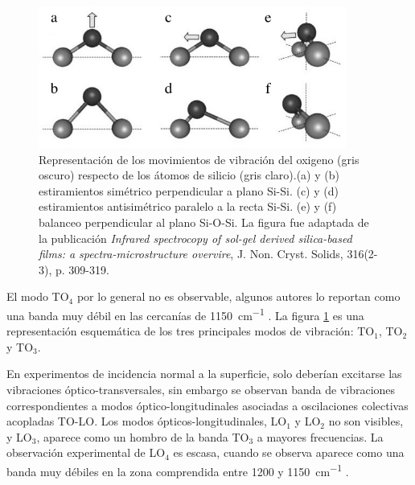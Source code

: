 		 		 \begin{figure}[!ht]
						\begin{center}
						\includegraphics[width=0.90\textwidth]{Imagenes/modos-infra.jpg}
						\caption[Modos de vibración Si-O-Si]{Representación de los movimientos de vibración del oxigeno (gris oscuro) respecto de los átomos de silicio (gris claro).(a) y (b) estiramientos simétrico perpendicular a plano Si-Si. (c) y (d) estiramientos antisimétrico paralelo a la recta Si-Si. (e) y (f) balanceo perpendicular al plano Si-O-Si. La figura fue adaptada de la publicación \textit{Infrared spectrocopy of sol-gel derived silica-based films: a spectra-microstructure overvire}, J. Non. Cryst. Solids, 316(2-3), p. 309-319. }
						\label{fig:modos-ir}
						\end{center}
						\end{figure}

		 El modo TO$_4$ por lo general no es observable, algunos autores lo reportan como una banda muy débil en las cercanías de \SI{1150}{\cm^{-1}} \cite{Pai1986,Grosse1986}. La figura \ref{fig:modos-ir} es una representación esquemática de los tres principales modos de vibración: TO$_1$, TO$_2$ y TO$_3$.

		 En experimentos de incidencia normal a la superficie, solo deberían excitarse las vibraciones óptico-transversales, sin embargo se observan banda de vibraciones correspondientes a modos óptico-longitudinales asociadas a oscilaciones colectivas acopladas TO-LO\cite{Pai1986,Grosse1986,Innocenzi2003}. Los modos ópticos-longitudinales, LO$_1$ y LO$_2$ no son visibles, y LO$_3$, aparece como un hombro de la banda TO$_3$ a mayores frecuencias. La observación experimental de LO$_4$ es escasa, cuando se observa aparece como una banda muy débiles en la zona comprendida entre 1200 y \SI{1150}{\cm^{-1}} \cite{Pai1986,Grosse1986}.
				 
